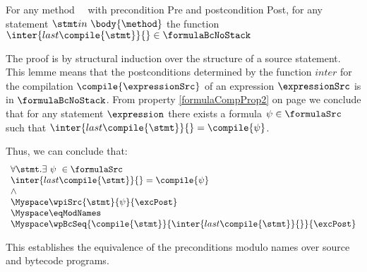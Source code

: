 \begin{postProp}

For any method ~\method \  with precondition Pre and postcondition Post,
 for any statement $\stmt in \ \body{\method}$
the function $\inter{ last{\compile{\stmt} } }{ \next{ last{\compile{\stmt}} }} \in \formulaBcNoStack$ 

\end{postProp}
The proof is by structural induction over the structure of a source statement.
 This lemme means that the postconditions determined by the function $inter$ for the compilation
 $\compile{\expressionSrc}$ of an expression $\expressionSrc$ is in $\formulaBcNoStack$.  
From property \ref{formulaCompProp2} on page \pageref{formulaCompProp2} we conclude that for any statement
$\expression$ there exists a formula
$\psi \in \formulaSrc$ such that  $\inter{ last{\compile{\stmt} } }{ \next{ last{\compile{\stmt}} }} = \compile{\psi} $.

Thus, we can conclude that:
$$ 
\begin{array}{l}
\forall \stmt . \exists \ \psi \ \in \formulaSrc \\
\inter{ last{\compile{\stmt} } }{ \next{ last{\compile{\stmt}} }} = \compile{\psi} \\
\wedge \\

\Myspace   \wpiSrc{\stmt}{ \psi }{\excPost} \\
\Myspace \eqModNames \\
\Myspace \wpBcSeq{\compile{ \stmt} } {\inter{ last{\compile{\stmt} } }{ \next{ last{\compile{\stmt}} }}  }{\excPost}
\end{array}$$



This establishes the equivalence of the preconditions modulo names over source and bytecode programs.

